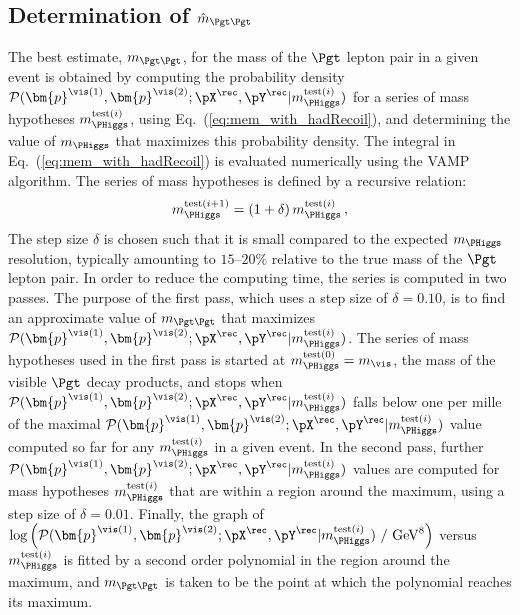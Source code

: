 \subsection{Determination of $\hat{m}_{\Pgt\Pgt}$}
\label{sec:mem_numericalMaximization}

The best estimate, $m_{\Pgt\Pgt}$, for the mass of the $\Pgt$ lepton pair in a given event
is obtained by computing the probability density $\mathcal{P}(\bm{p}^{\vis(1)},\bm{p}^{\vis(2)};\pX^{\rec},\pY^{\rec}|m_{\PHiggs}^{\textrm{test}(i)})$ 
for a series of mass hypotheses $m_{\PHiggs}^{\textrm{test}(i)}$, using Eq.~(\ref{eq:mem_with_hadRecoil}), and determining the value of $m_{\PHiggs}$ that maximizes this probability density.
The integral in Eq.~(\ref{eq:mem_with_hadRecoil}) is evaluated numerically using the VAMP algorithm.
The series of mass hypotheses is defined by a recursive relation: 
\begin{equation}
m_{\PHiggs}^{\textrm{test}(i + 1)} = (1 + \delta) \,  m_{\PHiggs}^{\textrm{test}(i)} \, ,
\label{eq:mTauTau_step_size}
\end{equation}
The step size $\delta$ is chosen such that it is small compared to the expected $m_{\PHiggs}$ resolution,
typically amounting to $15$--$20\%$ relative to the true mass of the $\Pgt$ lepton pair.
In order to reduce the computing time, the series is computed in two passes.
The purpose of the first pass, which uses a step size of $\delta = 0.10$, is to find an approximate value of $m_{\Pgt\Pgt}$
that maximizes $\mathcal{P}(\bm{p}^{\vis(1)},\bm{p}^{\vis(2)};\pX^{\rec},\pY^{\rec}|m_{\PHiggs}^{\textrm{test}(i)})$.
The series of mass hypotheses used in the first pass is started at $m_{\PHiggs}^{\textrm{test}(0)} = m_{\vis}$,
the mass of the visible $\Pgt$ decay products, 
and stops when $\mathcal{P}(\bm{p}^{\vis(1)},\bm{p}^{\vis(2)};\pX^{\rec},\pY^{\rec}|m_{\PHiggs}^{\textrm{test}(i)})$ falls below one per mille 
of the maximal $\mathcal{P}(\bm{p}^{\vis(1)},\bm{p}^{\vis(2)};\pX^{\rec},\pY^{\rec}|m_{\PHiggs}^{\textrm{test}(i)})$ value
computed so far for any $m_{\PHiggs}^{\textrm{test}(i)}$ in a given event.
In the second pass, further $\mathcal{P}(\bm{p}^{\vis(1)},\bm{p}^{\vis(2)};\pX^{\rec},\pY^{\rec}|m_{\PHiggs}^{\textrm{test}(i)})$ values 
are computed for mass hypotheses $m_{\PHiggs}^{\textrm{test}(i)}$ that are within a region around the maximum,
using a step size of $\delta = 0.01$.
Finally, the graph of $\log \left( \mathcal{P}(\bm{p}^{\vis(1)},\bm{p}^{\vis(2)};\pX^{\rec},\pY^{\rec}|m_{\PHiggs}^{\textrm{test}(i)})~/\mbox{~GeV}^{8} \right)$ 
versus $m_{\PHiggs}^{\textrm{test}(i)}$ is fitted by a second order polynomial
in the region around the maximum,
and $m_{\Pgt\Pgt}$ is taken to be the point at which the polynomial reaches its maximum.
